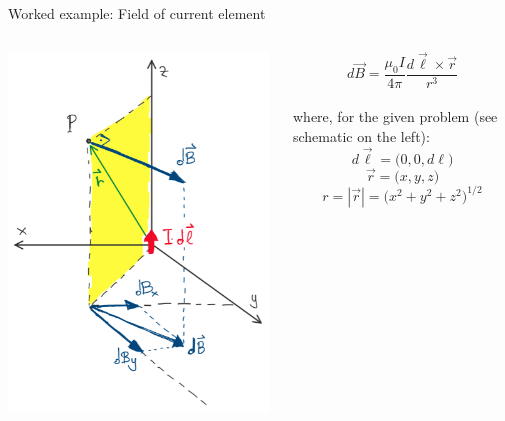 {\begin{frame}{Worked example: Field of current element}
  \begin{columns}
    \begin{column}{0.44\textwidth}
       \begin{center}
         \includegraphics[width=0.99\textwidth]{./images/problems/lect05_current_element_at_origin}\\
        \end{center}
    \end{column}
    \begin{column}{0.55\textwidth}
      \begin{equation*}
        d\vec{B} = \frac{\mu_0I}{4\pi} \frac{d\vec{\ell} \times \vec{r}}{r^3}
      \end{equation*}
      \\\vspace{0.4cm}
      where, for the given problem (see schematic on the left):\\
      \begin{equation*}
        d\vec{\ell} = \Big(0,0,d\ell\Big)
      \end{equation*}
      \begin{equation*}
        \vec{r} = \Big(x,y,z\Big)
      \end{equation*}
      \begin{equation*}
        r = |\vec{r}| = \Big(x^2 + y^2 + z^2\Big)^{1/2}
      \end{equation*}
    \end{column}
  \end{columns}


\end{frame}}
